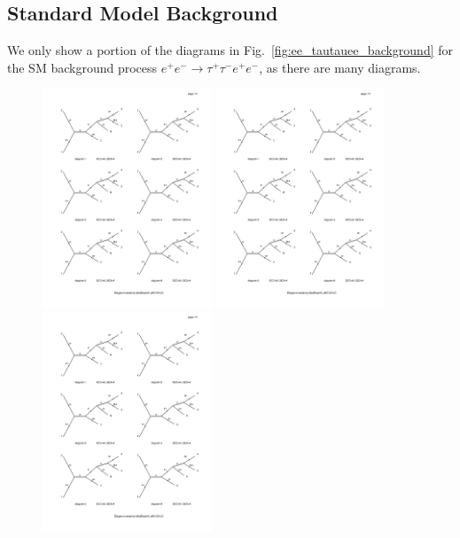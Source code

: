 \subsection{Standard Model Background}
We only show a portion of the diagrams in Fig.\ \ref{fig:ee_tautauee_background} for the SM background process $e^+ e^- \rightarrow \tau^+ \tau^- e^+ e^-$, as there are many diagrams.

\begin{figure}[h]
    \centering
    \includegraphics[width=0.45\textwidth,clip=true,viewport=65 550 315 730,page=1]{Figures/madgraph_diagrams/ee_tautauee_background.pdf}
    \includegraphics[width=0.45\textwidth,clip=true,viewport=65 110 315 310,page=3]{Figures/madgraph_diagrams/ee_tautauee_background.pdf}
    \includegraphics[width=0.45\textwidth,clip=true,viewport=65 550 315 730,page=5]{Figures/madgraph_diagrams/ee_tautauee_background.pdf}

\end{figure}
